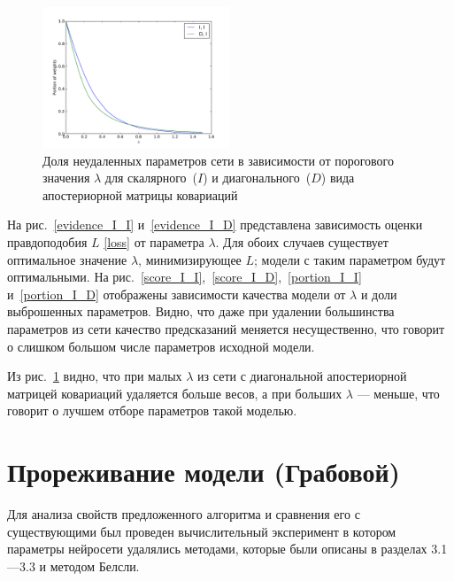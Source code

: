 \begin{figure}[!h]
	\centering
	\includegraphics[width=0.5\textwidth]{plots/smerdov/lambdas.pdf}
	\caption{Доля неудаленных параметров сети в зависимости от порогового значения $\lambda$ для скалярного~($I$) и диагонального~($D$) вида апостериорной матрицы ковариаций}
	\label{lambdas}
\end{figure}

 

На рис.~\ref{evidence_I_I} и~\ref{evidence_I_D} представлена зависимость оценки правдоподобия $L$ \eqref{loss} от параметра $\lambda$.
Для обоих случаев существует оптимальное значение $\lambda$, минимизирующее $L$; модели с таким параметром будут оптимальными. На рис.~\ref{score_I_I},~\ref{score_I_D},~\ref{portion_I_I} и~\ref{portion_I_D} отображены зависимости качества модели от $\lambda$ и доли выброшенных параметров. Видно, что даже при удалении большинства параметров из сети качество предсказаний меняется несущественно, что говорит о слишком большом числе параметров исходной модели.

Из рис.~\ref{lambdas} видно, что при малых $\lambda$ из сети с диагональной апостериорной матрицей ковариаций удаляется больше весов, а при больших $\lambda$ --- меньше, что говорит о лучшем отборе параметров такой моделью.


\section{Прореживание модели (Грабовой)}
Для анализа свойств предложенного алгоритма и сравнения его с существующими был проведен вычислительный эксперимент в котором параметры нейросети удалялись методами,  которые были описаны в разделах 3.1---3.3 и методом Белсли.

